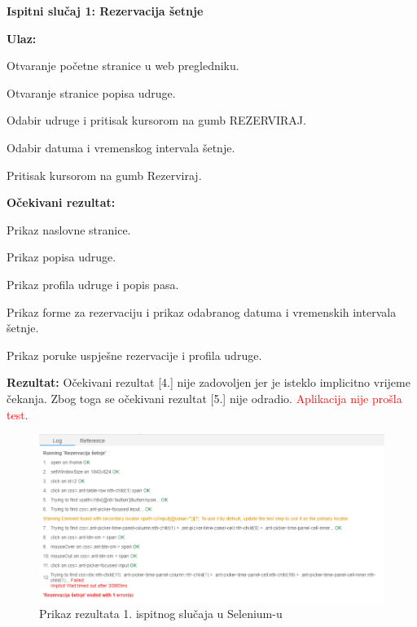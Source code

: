 			\noindent \textbf{Ispitni slučaj 1: Rezervacija šetnje}
			
			\noindent \textbf{Ulaz:}
			\begin{packed_enum}
				
				\item Otvaranje početne stranice u web pregledniku.
				\item Otvaranje stranice popisa udruge.
				\item Odabir udruge i pritisak kursorom na gumb REZERVIRAJ.
				\item Odabir datuma i vremenskog intervala šetnje.
				\item Pritisak kursorom na gumb Rezerviraj.
				
			\end{packed_enum}
			\textbf{Očekivani rezultat:}
			\begin{packed_enum}
				
				\item Prikaz naslovne stranice.
				\item Prikaz popisa udruge.
				\item Prikaz profila udruge i popis pasa.
				\item Prikaz forme za rezervaciju i prikaz odabranog datuma i vremenskih intervala šetnje.
				\item Prikaz poruke uspješne rezervacije i profila udruge.
				
			\end{packed_enum}
			\textbf{Rezultat:} Očekivani rezultat [4.] nije zadovoljen jer je isteklo implicitno vrijeme čekanja. Zbog toga se očekivani rezultat [5.] nije odradio. \textcolor{red}{Aplikacija nije prošla test.}
			
			\begin{figure}[H]
				\includegraphics[scale=0.6]{slike/rezervacijaSetnje.PNG} 
				\centering
				\caption{Prikaz rezultata 1. ispitnog slučaja u Selenium-u}
				\label{fig:sustav-prvi-slucaj}
			\end{figure}
		
